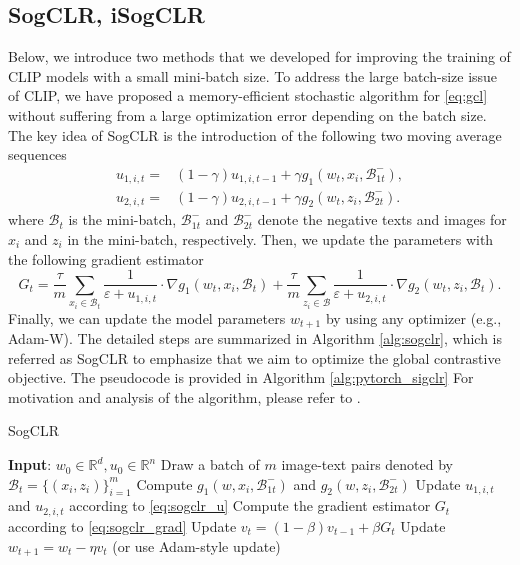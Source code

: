 \documentclass{article}
\begin{document}
\subsection{SogCLR, iSogCLR}
Below, we introduce two methods that we developed for improving the training of CLIP models with a small mini-batch size.  To address the large batch-size issue of CLIP, we have proposed a memory-efficient stochastic algorithm for \eqref{eq:gcl} without suffering from a large optimization error depending on the batch size. The key idea of SogCLR is the introduction of the following two moving average sequences
\begin{equation}  \label{eq:sogclr_u}
  \begin{aligned}
    u_{1, i, t}=& (1- \gamma) u_{1, i, t- 1}+ \gamma g_1(w_t, x_i, \mathcal{B}^{-}_{1t}), \\
    u_{2, i, t}=& (1- \gamma) u_{2, i, t- 1}+ \gamma g_2(w_t, z_i, \mathcal{B}^{-}_{2t}).
  \end{aligned}
\end{equation}
where $\mathcal B_t$ is the mini-batch, $\mathcal{B}^{-}_{1t}$ and $\mathcal{B}^{-}_{2t}$ denote the negative texts and images for $x_i$ and $z_i$ in the mini-batch, respectively. Then, we update the parameters with the following gradient estimator
\begin{equation}  \label{eq:sogclr_grad}
  G_t= \frac{\tau}{m} \sum_{x_i\in \mathcal{B}_t} \frac{1}{\varepsilon + u_{1, i, t}} \cdot \nabla g_1(w_t, x_i, \mathcal{B}_t) + \frac{\tau}{m} \sum_{z_i\in \mathcal{B}} \frac{1}{\varepsilon + u_{2, i, t}} \cdot \nabla g_2(w_t, z_i, \mathcal{B}_t).
\end{equation}
Finally, we can update the model parameters \(w_{t+ 1}\) by using any optimizer (e.g., Adam-W). The detailed steps are summarized in Algorithm \ref{alg:sogclr}, which is referred as SogCLR to emphasize that we aim to optimize the global contrastive objective. The pseudocode is provided in Algorithm \ref{alg:pytorch_sigclr} For motivation and analysis of the algorithm, please refer to \cite{yuan2022provable}.

\begin{algorithm}[H]
  \caption{SogCLR}
  \label{alg:sogclr}
  \textbf{Input}: \(w_0\in \mathbb{R}^d, u_0\in \mathbb{R}^n\)\;
   {
    Draw a batch of \(m\) image-text pairs denoted by \(\mathcal{B}_t= \{ (x_i, z_i)\}_{i= 1}^m\)\;
     {
      Compute \(g_1(w, x_i, \mathcal{B}_{1t}^-)\) and \(g_2(w, z_i, \mathcal{B}_{2t}^-)\)\;
      Update \(u_{1, i, t}\) and \(u_{2, i, t}\) according to \eqref{eq:sogclr_u}\;
    }
    Compute the gradient estimator \(G_t\) according to \eqref{eq:sogclr_grad}\;
    Update \(v_t= (1- \beta)v_{t- 1}+ \beta G_t\)\;
    Update \(w_{t+ 1}= w_t- \eta v_t\) (or use Adam-style update)\;
  }
\end{algorithm}
\end{document}
